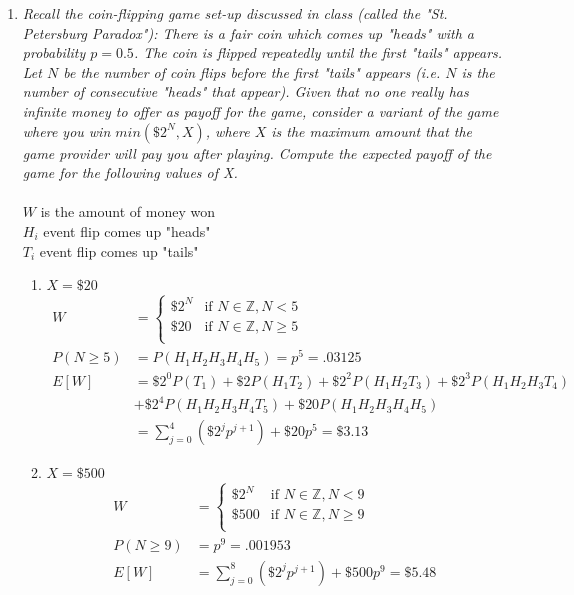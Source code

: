 \documentclass{article} %
\begin{document}
\begin{enumerate}
	\item \textit{Recall the coin-flipping game set-up discussed in class (called the "St. Petersburg Paradox"): There is a fair coin which comes up "heads" with a probability $p = 0.5$. The coin is flipped repeatedly until the first "tails" appears. Let $N$ be the number of coin flips before the first "tails" appears (i.e. $N$ is the number of consecutive "heads" that appear). Given that no one really has infinite money to offer as payoff for the game, consider a variant of the game where you win $min(\$2^N, X)$, where $X$ is the maximum amount that the game provider will pay you after playing. Compute the expected payoff of the game for the following values of X.}\\
	\\
	$W$ is the amount of money won\\
	$H_i$ event flip comes up "heads"\\
	$T_i$ event flip comes up "tails"
	\begin{enumerate}
		\item $X = \$20$
		\begin{align*}
		W &= 
			\begin{cases}
			\$2^N &\text{if } N \in \mathbb{Z}, N < 5\\
			\$20 &\text{if } N \in \mathbb{Z}, N \geq 5\\
			\end{cases}\\
		P(N \geq 5) &= P(H_1H_2H_3H_4H_5) = p^5 = .03125\\
		E[W] &= \$2^0P(T_1) + \$2P(H_1T_2) + \$2^2P(H_1H_2T_3) + \$2^3P(H_1H_2H_3T_4)\\
		&+ \$2^4P(H_1H_2H_3H_4T_5) + \$20P(H_1H_2H_3H_4H_5)\\
		&= \sum_{j=0}^{4} (\$2^j p^{j+1}) + \$20p^5 = \$3.13
		\end{align*}				
		
		\item $X = \$500$
		\begin{align*}
		W &= 
			\begin{cases}
			\$2^N &\text{if } N \in \mathbb{Z}, N < 9\\
			\$500 &\text{if } N \in \mathbb{Z}, N \geq 9\\
			\end{cases}\\
		P(N \geq 9) &= p^9 = .001953\\
		E[W] &= \sum_{j=0}^{8} (\$2^j p^{j+1}) + \$500p^9 = \$5.48
		\end{align*}
		

\end{enumerate}
\end{enumerate}
\end{document}
